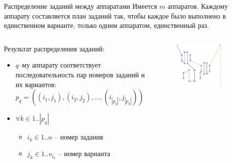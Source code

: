 \documentclass{beamer}
\begin{document}
\begin{frame}{Распределение заданий между аппаратами}
Имеется $m$ аппаратов. Каждому аппарату составляется план заданий так, чтобы каждое было выполнено в единственном варианте, только одним аппаратом, единственный раз.
\begin{columns}[onlytextwidth, t]
    \begin{column}{0.6\textwidth}
        \linebreak
        Результат распределения заданий:
        \begin{itemize}
            \item $q$--му аппарату соответствует последовательность пар номеров заданий и их вариантов:
            $p_q = ((i_1, j_1), (i_2, j_2), ..., (i_{|p_q|}, j_{|p_q|}))$
            \item $\forall k \in 1..|p_q|~ $
            \begin{itemize}
                \item $i_k \in 1..n$ -- номер задания
                \item $j_k \in 1..v_{i_k}$  -- номер варианта
            \end{itemize}

        \end{itemize}

    \end{column}
    \begin{column}{0.4\textwidth}

        \begin{figure}[here]
            \includegraphics[scale=0.4]{images/hk2.png}
        \end{figure}
    \end{column}

​\end{columns}
\end{frame}
\end{document}
